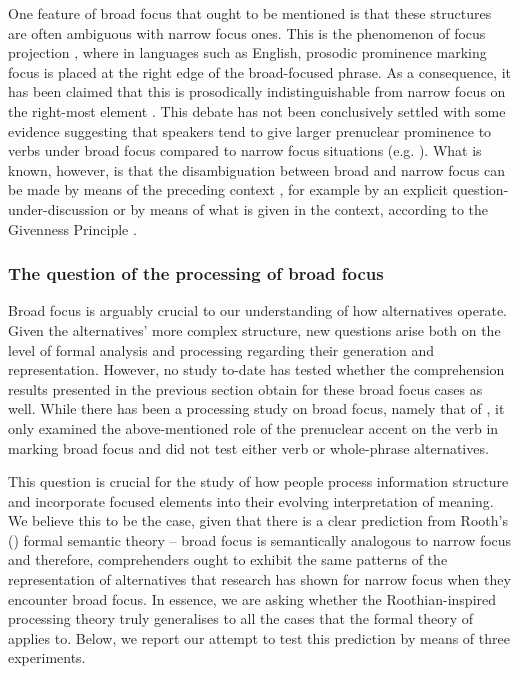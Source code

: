 \documentclass[output=paper,colorlinks,citecolor=brown]{langscibook}
\begin{document}
One feature of broad focus that ought to be mentioned is that these structures are often ambiguous with narrow focus ones. This is the phenomenon of focus projection \citep{rochemont1986focus,von1986some,selkirk1995sentence}, where in languages such as English, prosodic prominence marking focus is placed at the right edge of the broad-focused phrase. As a consequence, it has been claimed that this is prosodically indistinguishable from narrow focus on the right-most element \citep{ladd2008intonational}. This debate has not been conclusively settled with some evidence suggesting that speakers tend to give larger prenuclear prominence to verbs under broad focus compared to narrow focus situations (e.g. \citealt{breen2010acoustic}). What is known, however, is that the disambiguation between broad and narrow focus can be made by means of the preceding context \citep{Buring2007}, for example by an explicit question-under-discussion \citep{roberts2012information} or by means of what is given in the context, according to the Givenness Principle \citep{schwarzschild1999givenness}.


\subsubsection{The question of the processing of broad focus}

Broad focus is arguably crucial to our understanding of how alternatives operate. Given the alternatives' more complex structure, new questions arise both on the level of formal analysis \citep[e.g.][]{fox2011characterization} and processing regarding their generation and representation. However, no study to-date has tested whether the comprehension results presented in the previous section obtain for these broad focus cases as well. While there has been a processing study on broad focus, namely that of \citet{bishop2017focus}, it only examined the above-mentioned role of the prenuclear accent on the verb in marking broad focus and did not test either verb or whole-phrase alternatives.

This question is crucial for the study of how people process information structure and incorporate focused elements into their evolving interpretation of meaning. We believe this to be the case, given that there is a clear prediction from Rooth's (\citeyear{rooth1992}) formal semantic theory -- broad focus is semantically analogous to narrow focus and therefore, comprehenders ought to exhibit the same patterns of the representation of alternatives that research has shown for narrow focus when they encounter broad focus. In essence, we are asking whether the Roothian-inspired processing theory truly generalises to all the cases that the formal theory of \citet{rooth1992} applies to. Below, we report our attempt to test this prediction by means of three experiments.
\end{document}
